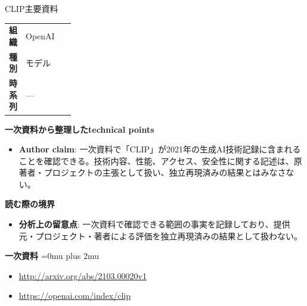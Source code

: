 \begin{technicalnote}{CLIP}{主要資料}
\begingroup
\begin{tabularx}{\linewidth}{@{}>{\bfseries}p{0.22\linewidth}X@{}}
組織 & OpenAI \\
種別 & モデル \\
時系列 & — \\
\end{tabularx}
\smallskip
{\bfseries 一次資料から整理したtechnical points}
\begin{itemize}[leftmargin=1.5em,itemsep=0.35em]
\item \textbf{Author claim}: 一次資料で「CLIP」が2021年の生成AI技術記録に含まれることを確認できる。技術内容、性能、アクセス、安全性に関する記述は、原著者・プロジェクトの主張として扱い、独立再現済みの結果とはみなさない。
\end{itemize}
\begin{minipage}{\linewidth}
{\bfseries 読む際の境界}
\begin{itemize}[leftmargin=1.5em,itemsep=0.35em]
\item \textbf{分析上の留意点}: 一次資料で確認できる範囲の事実を記録しており、提供元・プロジェクト・著者による評価を独立再現済みの結果として扱わない。
\end{itemize}
\begin{samepage}
{\bfseries 一次資料}
\begingroup\sloppy
\Urlmuskip=0mu plus 2mu\relax
\begin{itemize}[leftmargin=1.5em,itemsep=0.25em]
\item {\scriptsize\url{http://arxiv.org/abs/2103.00020v1}}
\item {\scriptsize\url{https://openai.com/index/clip}}
\end{itemize}
\endgroup
\end{samepage}
\end{minipage}
\endgroup
\end{technicalnote}
\medskip

